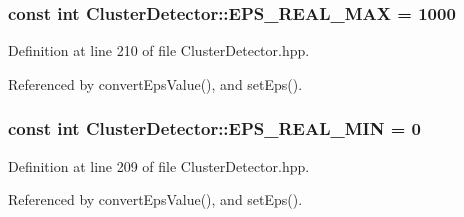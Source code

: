 \hypertarget{classmultiscale_1_1analysis_1_1ClusterDetector_a3e60b9e068a8addf9dd27382c74e6d62}{
\subsubsection[{\-E\-P\-S\-\_\-\-R\-E\-A\-L\-\_\-\-M\-A\-X}]{\setlength{\rightskip}{0pt plus 5cm}const int {\bf \-Cluster\-Detector\-::\-E\-P\-S\-\_\-\-R\-E\-A\-L\-\_\-\-M\-A\-X} = 1000}}\label{classmultiscale_1_1analysis_1_1ClusterDetector_a3e60b9e068a8addf9dd27382c74e6d62}


\-Definition at line 210 of file \-Cluster\-Detector.\-hpp.



\-Referenced by convert\-Eps\-Value(), and set\-Eps().

\hypertarget{classmultiscale_1_1analysis_1_1ClusterDetector_ad9542bde7e3bf36d501a0b203dc61e09}{
\subsubsection[{\-E\-P\-S\-\_\-\-R\-E\-A\-L\-\_\-\-M\-I\-N}]{\setlength{\rightskip}{0pt plus 5cm}const int {\bf \-Cluster\-Detector\-::\-E\-P\-S\-\_\-\-R\-E\-A\-L\-\_\-\-M\-I\-N} = 0}}\label{classmultiscale_1_1analysis_1_1ClusterDetector_ad9542bde7e3bf36d501a0b203dc61e09}


\-Definition at line 209 of file \-Cluster\-Detector.\-hpp.



\-Referenced by convert\-Eps\-Value(), and set\-Eps().

